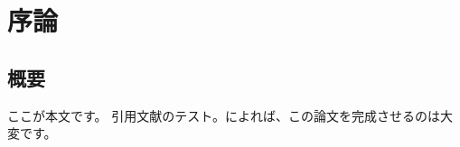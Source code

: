 \chapter{序論}\label{introduction}

\section{概要}
ここが本文です。
引用文献のテスト。\cite{mzks}によれば、この論文を完成させるのは大変です。

